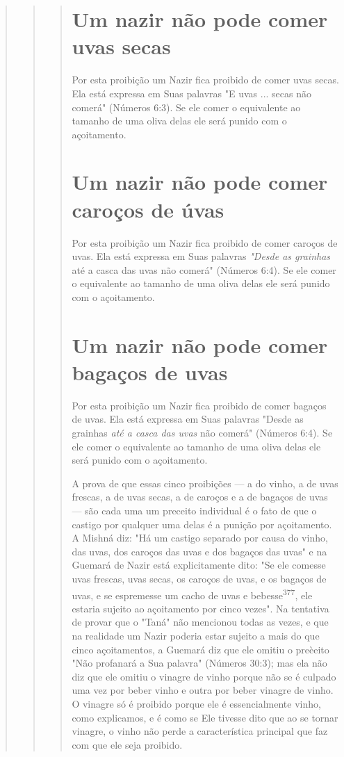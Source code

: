 \begin{quote}
\begin{quote}
\begin{quote}
\section{Um nazir não pode comer uvas secas}

Por esta proibição um Nazir fica proibido de comer uvas secas. Ela está
expressa em Suas palavras "E uvas ... secas não comerá" (Números 6:3).
Se ele comer o equivalente ao tamanho de uma oliva delas ele será punido
com o açoitamento.

\section{Um nazir não pode comer caroços de úvas}

Por esta proibição um Nazir fica proibido de comer caroços de uvas. Ela
está expressa em Suas palavras \emph{"Desde as grainhas} até a casca das
uvas não comerá" (Números 6:4). Se ele comer o equivalente ao tamanho de
uma oliva delas ele será punido com o açoitamento.

\section{Um nazir não pode comer bagaços de uvas}

Por esta proibição um Nazir fica proibido de comer bagaços de uvas. Ela
está expressa em Suas palavras "Desde as grainhas \emph{até a casca das
uvas} não comerá" (Números 6:4). Se ele comer o equivalente ao tamanho
de uma oliva delas ele será punido com o açoitamento.

A prova de que essas cinco proibições --- a do vinho, a de uvas
fres­cas, a de uvas secas, a de caroços e a de bagaços de uvas --- são
cada uma um
preceito individual é o fato de que o castigo por qualquer uma delas é a
puni­ção por açoitamento. A Mishná diz: "Há um castigo separado por
causa do vi­nho, das uvas, dos caroços das uvas e dos bagaços das uvas"
e na Guemará de Nazir está explicitamente dito: "Se ele comesse uvas
frescas, uvas secas, os ca­roços de uvas, e os bagaços de uvas, e se
espremesse um cacho de uvas e bebesse\textsuperscript{377}, ele estaria
sujeito ao açoitamento por cinco vezes". Na tentativa de provar que o
"Taná" não mencionou todas as vezes, e que na realidade um Nazir poderia
estar sujeito a mais do que cinco açoitamentos, a Guemará diz que ele
omitiu o preèeito "Não profanará a Sua palavra" (Números 30:3); mas ela
não diz que ele omitiu o vinagre de vinho porque não se é culpado uma
vez por beber vinho e outra por beber vinagre de vinho. O vinagre só é
proibi­do porque ele é essencialmente vinho, como explicamos, e é como
se Ele ti­vesse dito que ao se tornar vinagre, o vinho não perde a
característica principal que faz com que ele seja proibido.


\end{quote}
\end{quote}
\end{quote}
